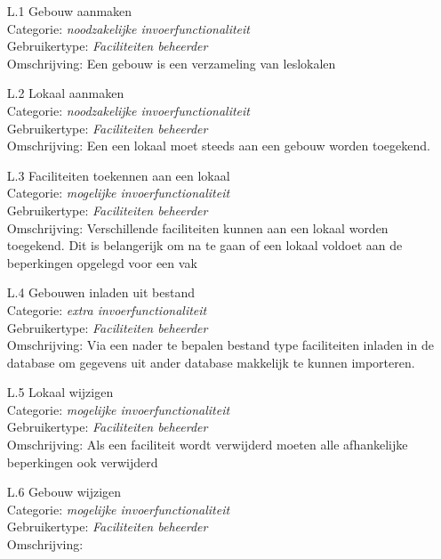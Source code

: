 \documentclass{article}
\begin{document}
\begin{itemize}
\item[L.1] Gebouw aanmaken \\
Categorie: \textit{noodzakelijke invoerfunctionaliteit} \\
Gebruikertype: \textit{Faciliteiten beheerder} \\
Omschrijving: Een gebouw is een verzameling van leslokalen\\[-3mm]

\item[L.2] Lokaal aanmaken \\
Categorie: \textit{noodzakelijke invoerfunctionaliteit} \\
Gebruikertype: \textit{Faciliteiten beheerder} \\
Omschrijving: Een een lokaal moet steeds aan een gebouw worden toegekend.\\[-3mm]

\item[L.3] Faciliteiten toekennen aan een lokaal \\
Categorie: \textit{mogelijke invoerfunctionaliteit} \\
Gebruikertype: \textit{Faciliteiten beheerder} \\
Omschrijving: Verschillende faciliteiten kunnen aan een lokaal worden toegekend. Dit is belangerijk om na te gaan of een lokaal voldoet aan de beperkingen opgelegd voor een vak\\[-3mm]

\item[L.4] Gebouwen inladen uit bestand \\
Categorie: \textit{extra invoerfunctionaliteit} \\
Gebruikertype: \textit{Faciliteiten beheerder} \\
Omschrijving: Via een nader te bepalen bestand type faciliteiten inladen in de database om gegevens uit ander database makkelijk te kunnen importeren. \\[-3mm]

\item[L.5] Lokaal wijzigen \\
Categorie: \textit{mogelijke invoerfunctionaliteit} \\
Gebruikertype: \textit{Faciliteiten beheerder}  \\
Omschrijving: Als een faciliteit wordt verwijderd moeten alle afhankelijke beperkingen ook verwijderd \\[-3mm]

\item[L.6] Gebouw wijzigen \\
Categorie: \textit{mogelijke invoerfunctionaliteit} \\
Gebruikertype: \textit{Faciliteiten  beheerder} \\
Omschrijving: \\[-3mm]


\end{itemize}
\end{document}
